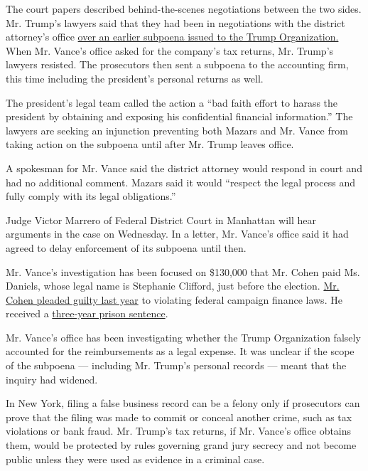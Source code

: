 The court papers described behind-the-scenes negotiations between the
two sides. Mr. Trump's lawyers said that they had been in negotiations
with the district attorney's office
\href{https://www.nytimes3xbfgragh.onion/2019/08/01/nyregion/trump-cohen-stormy-daniels-vance.html}{over
an earlier subpoena issued to the Trump Organization.} When Mr. Vance's
office asked for the company's tax returns, Mr. Trump's lawyers
resisted. The prosecutors then sent a subpoena to the accounting firm,
this time including the president's personal returns as well.

The president's legal team called the action a ``bad faith effort to
harass the president by obtaining and exposing his confidential
financial information.'' The lawyers are seeking an injunction
preventing both Mazars and Mr. Vance from taking action on the subpoena
until after Mr. Trump leaves office.

A spokesman for Mr. Vance said the district attorney would respond in
court and had no additional comment. Mazars said it would ``respect the
legal process and fully comply with its legal obligations.''

Judge Victor Marrero of Federal District Court in Manhattan will hear
arguments in the case on Wednesday. In a letter, Mr. Vance's office said
it had agreed to delay enforcement of its subpoena until then.

Mr. Vance's investigation has been focused on \$130,000 that Mr. Cohen
paid Ms. Daniels, whose legal name is Stephanie Clifford, just before
the election.
\href{https://www.nytimes3xbfgragh.onion/2018/08/21/nyregion/michael-cohen-plea-deal-trump.html?module=inline}{Mr.
Cohen pleaded guilty last year} to violating federal campaign finance
laws. He received a
\href{https://www.nytimes3xbfgragh.onion/2018/12/12/nyregion/michael-cohen-sentence-trump.html?module=inline}{three-year
prison sentence}.

Mr. Vance's office has been investigating whether the Trump Organization
falsely accounted for the reimbursements as a legal expense. It was
unclear if the scope of the subpoena --- including Mr. Trump's personal
records --- meant that the inquiry had widened.

In New York, filing a false business record can be a felony only if
prosecutors can prove that the filing was made to commit or conceal
another crime, such as tax violations or bank fraud. Mr. Trump's tax
returns, if Mr. Vance's office obtains them, would be protected by rules
governing grand jury secrecy and not become public unless they were used
as evidence in a criminal case.

